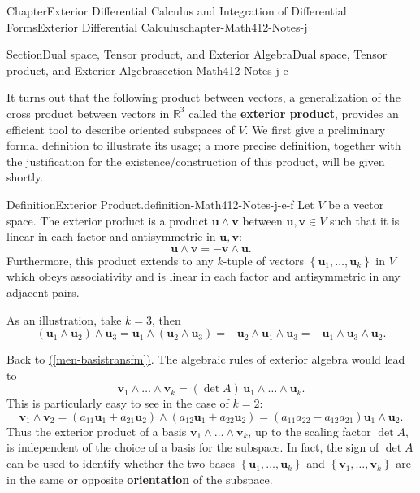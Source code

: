 \documentclass[oneside,10pt,]{book}
\newcommand{\xreffont}{\relax}
\newcommand{\terminology}[1]{\textbf{#1}}
\numberwithin{equation}{section}
\newcommand{\bu}{\mathbf{u}}
\newcommand{\bv}{\mathbf{v}}
\newcommand{\bbR}{\mathbb{R}}
\begin{document}
\begin{chapterptx}{Chapter}{Exterior Differential Calculus and Integration of Differential Forms}{}{Exterior Differential Calculus}{}{}{chapter-Math412-Notes-j}
\begin{sectionptx}{Section}{Dual space, Tensor product, and Exterior Algebra}{}{Dual space, Tensor product, and Exterior Algebra}{}{}{section-Math412-Notes-j-e}
%
\par
It turns out that the following product between vectors, a generalization of the cross product between vectors in \(\bbR^{3}\) called the \terminology{exterior product}, provides an efficient tool to describe oriented subspaces of \(V\). We first give a preliminary formal definition to illustrate its usage; a more  precise definition, together with the justification for the existence\slash{}construction of this product, will be given shortly.%
\begin{definition}{Definition}{Exterior Product.}{definition-Math412-Notes-j-e-f}%
Let \(V\) be a vector space. The exterior product is a product \(\bu\wedge \bv\) between \(\bu,\bv\in V\) such that it is linear in each factor and antisymmetric in \(\bu,\bv\):%
\begin{equation*}
\bu\wedge \bv=- \bv\wedge \bu.
\end{equation*}
Furthermore, this product extends to any \(k\)-tuple of vectors \(\left\{ {\mathbf u}_{1}, \ldots, {\mathbf u}_{k}\right\}\) in \(V\) which obeys associativity and is linear in each factor and antisymmetric in any adjacent pairs.%
\end{definition}
As an illustration, take \(k=3\), then%
\begin{equation*}
( \bu_{1}\wedge \bu_{2})\wedge \bu_{3}= \bu_{1}\wedge (\bu_{2}\wedge \bu_{3})
=- \bu_{2}\wedge \bu_{1}\wedge \bu_{3}=-
\bu_{1}\wedge \bu_{3}\wedge \bu_{2}\text{.}
\end{equation*}
%
\par
Back to \hyperref[men-basistransfm]{({\xreffont\ref{men-basistransfm}})}. The algebraic rules of exterior algebra would lead to%
\begin{equation}
{\mathbf v}_{1}\wedge \ldots\wedge {\mathbf v}_{k}=( \det A )\,
{\mathbf u}_{1}\wedge \ldots\wedge {\mathbf u}_{k}.\label{men-extbasis}
\end{equation}
This is particularly easy to see in the case of \(k=2\):%
\begin{equation*}
{\mathbf v}_{1}\wedge {\mathbf v}_{2}= \left( a_{11} {\mathbf u}_{1}+a_{21} {\mathbf u}_{2}\right)
\wedge \left( a_{12} {\mathbf u}_{1}+a_{22} {\mathbf u}_{2}\right)
= \left( a_{11}a_{22}-a_{12}a_{21}\right)  {\mathbf u}_{1}\wedge {\mathbf u}_{2}.
\end{equation*}
Thus the exterior product of a basis \({\mathbf v}_{1}\wedge \ldots\wedge {\mathbf v}_{k}\), up to the scaling factor \(\det A\), is independent of the choice of  a basis for the subspace.  In fact, the sign of \(\det A\) can be used to identify whether the two bases \(\left\{ {\mathbf u}_{1}, \ldots, {\mathbf u}_{k}\right\}\) and \(\left\{ {\mathbf v}_{1}, \ldots, {\mathbf v}_{k}\right\}\) are in the same or opposite \terminology{orientation} of the subspace.%

\end{sectionptx}
\end{chapterptx}
\end{document}
